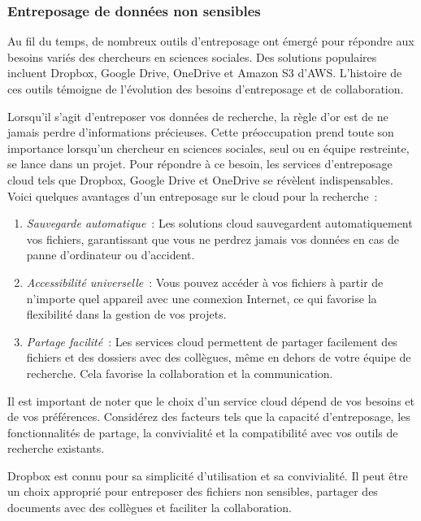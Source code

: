\documentclass[
  letterpaper,
  DIV=11,
  numbers=noendperiod]{scrreprt}
\begin{document}
\subsubsection{Entreposage de données non
sensibles}\label{entreposage-de-donnuxe9es-non-sensibles}

Au fil du temps, de nombreux outils d'entreposage ont émergé pour
répondre aux besoins variés des chercheurs en sciences sociales. Des
solutions populaires incluent Dropbox, Google Drive, OneDrive et Amazon
S3 d'AWS. L'histoire de ces outils témoigne de l'évolution des besoins
d'entreposage et de collaboration.

Lorsqu'il s'agit d'entreposer vos données de recherche, la règle d'or
est de ne jamais perdre d'informations précieuses. Cette préoccupation
prend toute son importance lorsqu'un chercheur en sciences sociales,
seul ou en équipe restreinte, se lance dans un projet. Pour répondre à
ce besoin, les services d'entreposage cloud tels que Dropbox, Google
Drive et OneDrive se révèlent indispensables. Voici quelques avantages
d'un entreposage sur le cloud pour la recherche~:

\begin{enumerate}
\def\labelenumi{\arabic{enumi}.}
\item
  \emph{Sauvegarde automatique}~: Les solutions cloud sauvegardent
  automatiquement vos fichiers, garantissant que vous ne perdrez jamais
  vos données en cas de panne d'ordinateur ou d'accident.
\item
  \emph{Accessibilité universelle}~: Vous pouvez accéder à vos fichiers
  à partir de n'importe quel appareil avec une connexion Internet, ce
  qui favorise la flexibilité dans la gestion de vos projets.
\item
  \emph{Partage facilité}~: Les services cloud permettent de partager
  facilement des fichiers et des dossiers avec des collègues, même en
  dehors de votre équipe de recherche. Cela favorise la collaboration et
  la communication.
\end{enumerate}

Il est important de noter que le choix d'un service cloud dépend de vos
besoins et de vos préférences. Considérez des facteurs tels que la
capacité d'entreposage, les fonctionnalités de partage, la convivialité
et la compatibilité avec vos outils de recherche existants.

Dropbox est connu pour sa simplicité d'utilisation et sa convivialité.
Il peut être un choix approprié pour entreposer des fichiers non
sensibles, partager des documents avec des collègues et faciliter la
collaboration.
\end{document}
